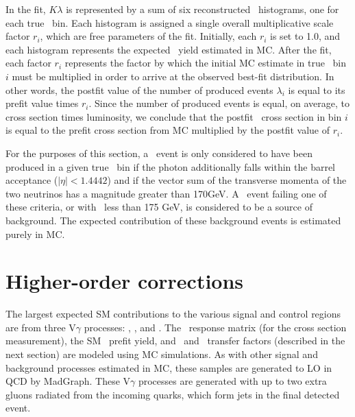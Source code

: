 In the fit, $K \lambda$ is represented by a sum of six reconstructed \ETgamma\ histograms, one for each true \pTgamma\ bin. Each histogram is assigned a single overall
multiplicative scale factor $r_{i}$, which are free parameters of the fit.
Initially, each $r_{i}$ is set to 1.0, and each histogram represents the expected \zinvg\ yield estimated in MC. After the fit, each factor $r_{i}$ represents the factor
by which the initial MC estimate in true \ETgamma\ bin $i$ must be multiplied in order to arrive at the observed best-fit distribution. In other words, the postfit value
of the number of produced events $\lambda_{i}$ is equal to its prefit value times $r_{i}$.
Since the number of produced events is equal, on average, to cross section times luminosity, we conclude that the postfit \zinvg\ cross
section in bin $i$ is equal to the prefit cross section from MC multiplied by the postfit value of $r_{i}$.


For the purposes of this section, a \zinvg\ event is only considered to
have been produced in a given true \pTgamma\ bin if the photon additionally falls within the barrel acceptance ($|\eta| < 1.4442$) and
if the vector sum of the transverse momenta of the two neutrinos has a magnitude greater than 170\unit{GeV}. A \zinvg\ event failing one of these
criteria, or with \ETgamma\ less than 175 GeV, is considered to be a source of background. The expected contribution of these background events is estimated
purely in MC.

\section{Higher-order corrections}
The largest expected SM contributions to the various signal and control regions are from three $\mathrm{V}\gamma$
processes: \zinvg, \wlng, and \zllg.
The \zinvg\ response matrix (for the cross section measurement), the SM \zinvg\ prefit yield,
and \wlng\ and \zllg\ transfer factors (described in the next section) are modeled using MC simulations.
As with other signal and background processes estimated in MC, these samples are generated to LO in QCD by MadGraph.
These $\mathrm{V}\gamma$ processes are generated with up to two extra gluons radiated from the incoming quarks,
which form jets in the final detected event.

